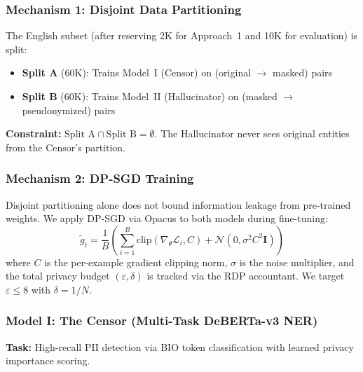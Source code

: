 \documentclass[9pt]{article}
\begin{document}
\subsubsection{Mechanism 1: Disjoint Data Partitioning}
The English subset (after reserving 2K for Approach~1 and 10K for evaluation) is split:
\begin{itemize}
    \item \textbf{Split A} (60K): Trains Model~I (Censor) on (original $\rightarrow$ masked) pairs
    \item \textbf{Split B} (60K): Trains Model~II (Hallucinator) on (masked $\rightarrow$ pseudonymized) pairs
\end{itemize}
\textbf{Constraint:} $\text{Split A} \cap \text{Split B} = \emptyset$. The Hallucinator never sees original entities from the Censor's partition.

\subsubsection{Mechanism 2: DP-SGD Training}
Disjoint partitioning alone does not bound information leakage from pre-trained weights. We apply DP-SGD \cite{abadi2016deep} via Opacus \cite{opacus2021} to both models during fine-tuning:
\begin{equation}
    \tilde{g}_t = \frac{1}{B}\left(\sum_{i=1}^{B} \text{clip}(\nabla_\theta \mathcal{L}_i, C) + \mathcal{N}(0, \sigma^2 C^2 \mathbf{I})\right)
\end{equation}
where $C$ is the per-example gradient clipping norm, $\sigma$ is the noise multiplier, and the total privacy budget $(\varepsilon, \delta)$ is tracked via the RDP accountant. We target $\varepsilon \leq 8$ with $\delta = 1/N$.

\subsubsection{Model I: The Censor (Multi-Task DeBERTa-v3 NER)}
\textbf{Task:} High-recall PII detection via BIO token classification with learned privacy importance scoring.
\end{document}
